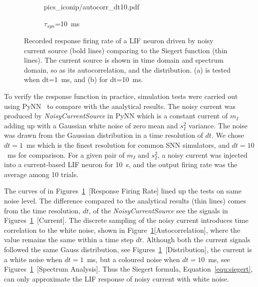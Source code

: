 \begin{figure}
\begin{subfigure}[c]{0.45\textwidth}
{			{pics_iconip/autocorr_dt10.pdf}}
		\caption{$\tau_{syn}$=10~ms}
	\end{subfigure}%
	\caption{Recorded response firing rate of a LIF neuron driven by noisy current source (bold lines) comparing to the Siegert function (thin lines). The current source is shown in time domain and spectrum domain, so as its autocorrelation, and the distribution. (a) is tested when dt=1~ms, and (b) for dt=10~ms.}
	\label{Fig:lif_curr}
\end{figure}

	To verify the response function in practice, simulation tests were carried out using PyNN~\cite{davison2008pynn} to compare with the analytical results.
	The noisy current was produced by \textit{NoisyCurrentSource} in PyNN which is a constant current of $m_I$ adding up with a Gaussian white noise of zero mean and $s_I^2$ variance.
	The noise was drawn from the Gaussian distribution in a time resolution of $dt$.
	We chose $dt=1$~ms which is the finest resolution for common SNN simulators, and $dt=10$~ms for comparison.
	For a given pair of $m_I$ and $s_I^2$, a noisy current was injected into a current-based LIF neuron for 10~s, and the output firing rate was the average among 10 trials.
	
	The curves of in Figures~\ref{Fig:lif_curr}~[Response Firing Rate] lined up the tests on same noise level.
	The difference compared to the analytical results (thin lines) comes from the time resolution, $dt$, of the \textit{NoisyCurrentSource} see the signals in Figures~\ref{Fig:lif_curr}~[Current].
	The discrete sampling of the noisy current introduces time correlation to the white noise, shown in Figure~\ref{Fig:lif_curr}[Autocorrelation], where the value remains the same within a time step $dt$.
	Although both the current signals followed the same Gauss distribution, see Figures~\ref{Fig:lif_curr}~[Distribution], the current is a white noise when $dt=1$~ms, but a coloured noise when $dt=10$~ms, see Figures~\ref{Fig:lif_curr}~[Spectrum Analysis].
	Thus the Siegert formula, Equation~\ref{equ:siegert}, can only approximate the LIF response of noisy current with white noise.


